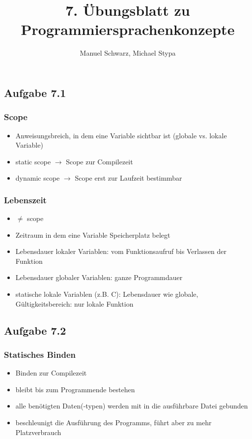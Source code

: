 \documentclass[a4paper, 12pt]{article}
\title{7. Übungsblatt zu Programmiersprachenkonzepte}
\author{Manuel Schwarz, Michael Stypa}
\begin{document}
\maketitle

\subsection*{Aufgabe 7.1}

\subsubsection*{Scope}
\begin{itemize}
  \item Anweisungsbreich, in dem eine Variable sichtbar ist (globale vs.
        lokale Variable)
  \item static scope $\rightarrow$ Scope zur Compilezeit
  \item dynamic scope $\rightarrow$ Scope erst zur Laufzeit bestimmbar
\end{itemize}

\subsubsection*{Lebenszeit}
\begin{itemize}
  \item $\neq$ scope
  \item Zeitraum in dem eine Variable Speicherplatz belegt
  \item Lebensdauer lokaler Variablen: vom Funktionsaufruf bis Verlassen der
        Funktion
  \item Lebensdauer globaler Variablen: ganze Programmdauer
  \item statische lokale Variablen (z.B. C): Lebensdauer wie globale,
        Gültigkeitsbereich: nur lokale Funktion
\end{itemize}

\subsection*{Aufgabe 7.2}

\subsubsection*{Statisches Binden}
\begin{itemize}
  \item Binden zur Compilezeit
  \item bleibt bis zum Programmende bestehen
  \item alle benötigten Daten(-typen) werden mit in die ausführbare Datei
        gebunden
  \item beschleunigt die Ausführung des Programms, führt aber zu mehr 
        Platzverbrauch
\end{itemize}
\end{document}
